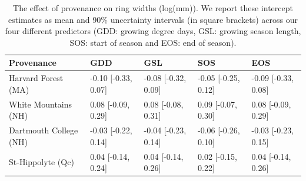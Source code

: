 \begin{table}[ht]
\centering
\caption{The effect of provenance on ring widths (log(mm)). We report these intercept estimates as mean and 90\% uncertainty intervals (in square brackets) across our four different predictors (GDD: growing degree days, GSL: growing season length, SOS: start of season and EOS: end of season).} 
\label{tab:wc_asite_table}
\begin{tabular}{lllll}
  \hline
Provenance & GDD & GSL & SOS & EOS \\ 
  \hline
Harvard Forest (MA) & -0.10 [-0.33, 0.07] & -0.08 [-0.32, 0.09] & -0.05 [-0.25, 0.12] & -0.09 [-0.33, 0.08] \\ 
  White Mountains (NH) & 0.08 [-0.09, 0.29] & 0.08 [-0.08, 0.31] & 0.09 [-0.07, 0.30] & 0.08 [-0.09, 0.29] \\ 
  Dartmouth College (NH) & -0.03 [-0.22, 0.14] & -0.04 [-0.23, 0.14] & -0.06 [-0.26, 0.10] & -0.03 [-0.23, 0.15] \\ 
  St-Hippolyte (Qc) & 0.04 [-0.14, 0.24] & 0.04 [-0.14, 0.26] & 0.02 [-0.15, 0.22] & 0.04 [-0.14, 0.26] \\ 
   \hline
\end{tabular}
\end{table}


